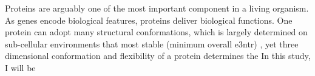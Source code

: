 Proteins are arguably one of the most important component in a living organism. As genes encode biological features, proteins deliver biological functions. One protein can adopt many structural conformations, which is largely determined on sub-cellular environments that most stable (minimum overall e3ntr) , yet three dimensional conformation and flexibility of a protein determines the     In this study, I will be 